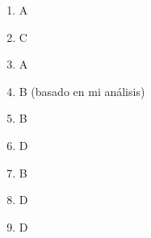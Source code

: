 \documentclass[12pt, a4paper]{article}
\newcommand{\respitem}[1]{\item[\textbf{#1.}]} %
\begin{document}
\begin{enumerate}
    \respitem{40} A
    \respitem{54} C %
    \respitem{55} A %
    \respitem{55} B (basado en mi análisis)
    \respitem{56} B %
    \respitem{57} D %
    \respitem{57} B
    \respitem{58} D %
    \respitem{59} D %

\end{enumerate}
\end{document}
